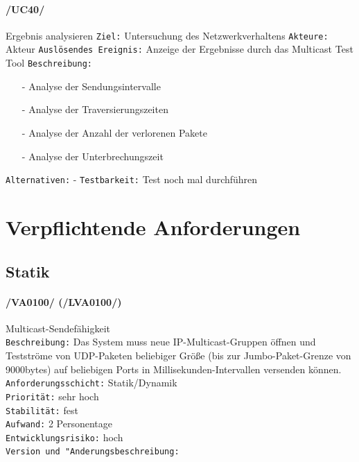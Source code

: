\paragraph{/UC40/} Ergebnis analysieren\newline
\texttt{Ziel:} Untersuchung des Netzwerkverhaltens\newline
\texttt{Akteure:} Akteur\newline
\texttt{Auslösendes Ereignis:} Anzeige der Ergebnisse durch das
Multicast Test Tool\newline
\texttt{Beschreibung:}
\begin{itemize}
  \item[-] Analyse der Sendungsintervalle
  \item[-] Analyse der Traversierungszeiten
  \item[-] Analyse der Anzahl der verlorenen Pakete
  \item[-] Analyse der Unterbrechungszeit
\end{itemize}
\texttt{Alternativen:} -\newline
\texttt{Testbarkeit:} Test noch mal durchführen\newline

\clearpage

\section{Verpflichtende Anforderungen}
\label{sec:mandatory}


\subsection{Statik}
\label{sec:statik}

\paragraph{/VA0100/ (/LVA0100/)} Multicast-Sendefähigkeit\\
\texttt{Beschreibung:} Das System muss neue IP-Multicast-Gruppen öffnen und
Testströme von UDP-Paketen beliebiger Größe (bis zur Jumbo-Paket-Grenze von
9000bytes) auf beliebigen Ports in Millisekunden-Intervallen versenden können.\\
\texttt{Anforderungsschicht:} Statik/Dynamik\\
\texttt{Priorität:} sehr hoch\\
\texttt{Stabilität:} fest\\
\texttt{Aufwand:} 2 Personentage\\
\texttt{Entwicklungsrisiko:} hoch\\
\texttt{Version und "Anderungsbeschreibung:}


